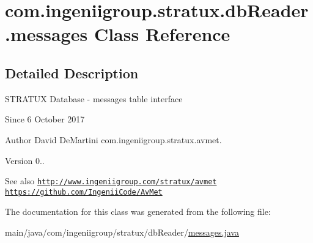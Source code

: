 \hypertarget{classcom_1_1ingeniigroup_1_1stratux_1_1db_reader_1_1messages}{}\section{com.\+ingeniigroup.\+stratux.\+db\+Reader.\+messages Class Reference}
\label{classcom_1_1ingeniigroup_1_1stratux_1_1db_reader_1_1messages}


\subsection{Detailed Description}
S\+T\+R\+A\+T\+UX Database -\/ messages table interface

\begin{DoxySince}{Since}
6 October 2017 
\end{DoxySince}
\begin{DoxyAuthor}{Author}
David De\+Martini  com.\+ingeniigroup.\+stratux.\+avmet. 
\end{DoxyAuthor}
\begin{DoxyVersion}{Version}
0.. 
\end{DoxyVersion}
\begin{DoxySeeAlso}{See also}
\href{http://www.ingeniigroup.com/stratux/avmet}{\tt http\+://www.\+ingeniigroup.\+com/stratux/avmet}  \href{https://github.com/IngeniiCode/AvMet}{\tt https\+://github.\+com/\+Ingenii\+Code/\+Av\+Met} 
\end{DoxySeeAlso}


The documentation for this class was generated from the following file\+:\begin{DoxyCompactItemize}
\item 
main/java/com/ingeniigroup/stratux/db\+Reader/\hyperlink{messages_8java}{messages.\+java}\end{DoxyCompactItemize}
